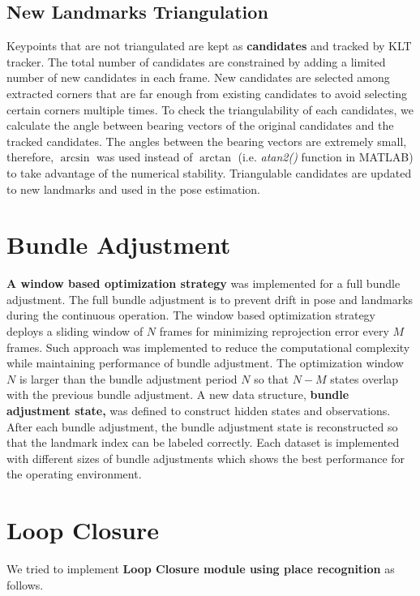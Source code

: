 \subsection*{New Landmarks Triangulation}
Keypoints that are not triangulated are kept as \textbf{candidates} and tracked by KLT tracker. The total number of candidates are constrained by adding a limited number of new candidates in each frame. New candidates are selected among extracted corners that are far enough from existing candidates to avoid selecting certain corners multiple times. 
To check the triangulability of each candidates, we calculate the angle between bearing vectors of the original candidates and the tracked candidates. The angles between the bearing vectors are extremely small, therefore, $\arcsin$ was used instead of $\arctan$ (i.e. \textit{atan2()} function in MATLAB) to take advantage of the numerical stability. Triangulable candidates are updated to new landmarks and used in the pose estimation. 

\section{Bundle Adjustment}
\textbf{A window based optimization strategy} was implemented for a full bundle adjustment. The full bundle adjustment is to prevent drift in pose and landmarks during the continuous operation. The window based optimization strategy deploys a sliding window of $N$ frames for minimizing reprojection error every $M$ frames. Such approach was implemented to reduce the computational complexity while maintaining performance of bundle adjustment. The optimization window $N$ is larger than the bundle adjustment period $N$ so that $N-M$ states overlap with the previous bundle adjustment. \newline
A new data structure, \textbf{bundle adjustment state,} was defined to construct hidden states and observations. After each bundle adjustment, the bundle adjustment state is reconstructed so that the landmark index can be labeled correctly. \newline 
Each dataset is implemented with different sizes of bundle adjustments which shows the best performance for the operating environment. 

\section{Loop Closure}

We tried to implement \textbf{Loop Closure module using place recognition} as follows.

